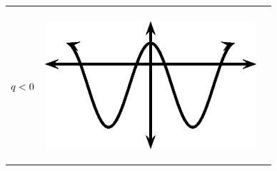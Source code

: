 \begin{center}
\begin{xtabular*}{\mytablewidth}[t]{|p{10\mystarwidth}|p{10\mystarwidth}|p{10\mystarwidth}|}
\begin{center}
    \end{center}



    \addtocounter{footnote}{-0}
    
     \tabularnewline{}
    
    
        
                  \begin{math}q<{}0\end{math}
                 &
    
    
        
                  
    \setcounter{subfigure}{0}

\label{m39414*id88234}
    \begin{center}
    \label{m39414*id88234!!!underscore!!!media}\label{m39414*id88234!!!underscore!!!printimage}\includegraphics{col11306.imgs/m39414_MG10C15_028.png} %
        
      \vspace{2pt}
    \vspace{.1in}
    
    \end{center}



    \addtocounter{footnote}{-0}
    
                 &
    
    

\end{xtabular*}
\end{center}
